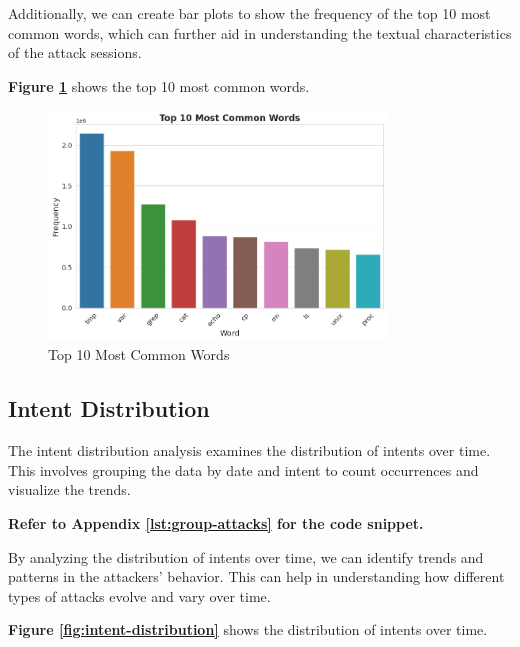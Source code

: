         Additionally, we can create bar plots to show the frequency of the top 10 most common words, which can further aid in understanding the textual characteristics of the attack sessions.

        \textbf{Figure \ref{fig:common-words}} shows the top 10 most common words.

        \begin{figure}[h]
            \centering
            \includegraphics[width=0.8\textwidth]{../figures/plots/section1/top_10_most_common_words.png}
            \caption{Top 10 Most Common Words}
            \label{fig:common-words}
        \end{figure}

    \subsection{Intent Distribution}
            
        The intent distribution analysis examines the distribution of intents over time. This involves grouping the data by date and intent to count occurrences and visualize the trends.
            
        \textbf{Refer to Appendix \ref{lst:group-attacks} for the code snippet.}

        By analyzing the distribution of intents over time, we can identify trends and patterns in the attackers' behavior. This can help in understanding how different types of attacks evolve and vary over time.

        \textbf{Figure \ref{fig:intent-distribution}} shows the distribution of intents over time.

